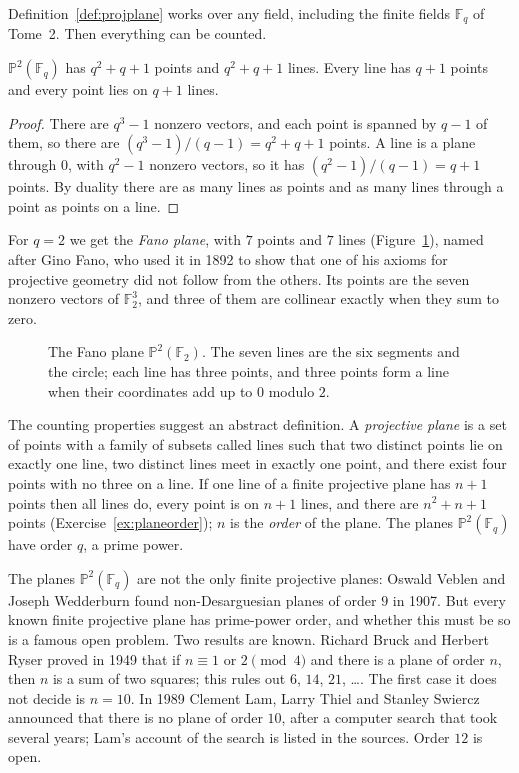 Definition~\ref{def:projplane} works over any field, including the finite fields $\mathbb F_q$ of Tome~2. Then everything can be counted.

\begin{proposition}\label{prop:countplane}
$\mathbb P^2(\mathbb F_q)$ has $q^2+q+1$ points and $q^2+q+1$ lines. Every line has $q+1$ points and every point lies on $q+1$ lines.
\end{proposition}

\begin{proof}
There are $q^3-1$ nonzero vectors, and each point is spanned by $q-1$ of them, so there are $(q^3-1)/(q-1)=q^2+q+1$ points. A line is a plane
through $0$, with $q^2-1$ nonzero vectors, so it has $(q^2-1)/(q-1)=q+1$ points. By duality there are as many lines as points and as many lines
through a point as points on a line.
\end{proof}

For $q=2$ we get the \emph{Fano plane}, with $7$ points and $7$ lines (Figure~\ref{fig:fano}), named after Gino Fano, who used it in 1892 to show
that one of his axioms for projective geometry did not follow from the others. Its points are the seven nonzero vectors of $\mathbb F_2^3$, and
three of them are collinear exactly when they sum to zero.

\begin{figure}[ht]
\centering
{}
\caption{The Fano plane $\mathbb P^2(\mathbb F_2)$. The seven lines are the six segments and the circle; each line has three points, and three
points form a line when their coordinates add up to $0$ modulo $2$.}
\label{fig:fano}
\end{figure}

The counting properties suggest an abstract definition. A \emph{projective plane} is a set of points with a family of subsets called lines such
that two distinct points lie on exactly one line, two distinct lines meet in exactly one point, and there exist four points with no three on a
line. If one line of a finite projective plane has $n+1$ points then all lines do, every point is on $n+1$ lines, and there are $n^2+n+1$ points
(Exercise~\ref{ex:planeorder}); $n$ is the \emph{order} of the plane. The planes $\mathbb P^2(\mathbb F_q)$ have order $q$, a prime power.

\begin{remark}
The planes $\mathbb P^2(\mathbb F_q)$ are not the only finite projective planes: Oswald Veblen and Joseph Wedderburn found non-Desarguesian
planes of order $9$ in 1907. But every known finite projective plane has prime-power order, and whether this must be so is a famous open
problem. Two results are known. Richard Bruck and Herbert Ryser proved in 1949 that if $n\equiv1$ or $2\pmod 4$ and there is a plane of order $n$,
then $n$ is a sum of two squares; this rules out $6$, $14$, $21$, \dots. The first case it does not decide is $n=10$. In 1989 Clement Lam, Larry
Thiel and Stanley Swiercz announced that there is no plane of order $10$, after a computer search that took several years; Lam's account of the
search is listed in the sources. Order $12$ is open.
\end{remark}


